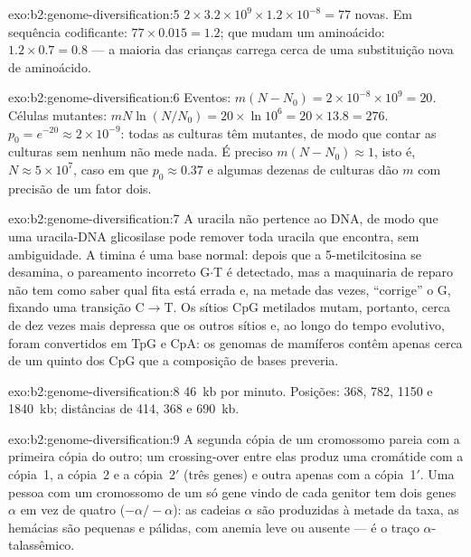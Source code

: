 \begin{solution}{exo:b2:genome-diversification:5}
$2\times 3.2\times 10^{9}\times 1.2\times 10^{-8} = 77$  novas.
Em sequência codificante: $77\times 0.015 = 1.2$; que mudam um
aminoácido: $1.2\times 0.7 = 0.8$ --- a maioria das crianças carrega
cerca de uma substituição nova de aminoácido.
\end{solution}

\begin{solution}{exo:b2:genome-diversification:6}
Eventos: $m(N - N_0) = 2\times 10^{-8}\times 10^{9} = 20$. Células
mutantes: $mN\ln(N/N_0) = 20\times \ln 10^{6} = 20\times 13.8 = 276$.
$p_0 = e^{-20} \approx 2\times 10^{-9}$: todas as culturas têm
mutantes, de modo que contar as culturas sem nenhum não mede nada. É
preciso $m(N -
N_0) \approx 1$, isto é, $N \approx 5\times 10^{7}$, caso em que
$p_0 \approx
0.37$ e algumas dezenas de culturas dão $m$ com precisão de um fator
dois.
\end{solution}

\begin{solution}{exo:b2:genome-diversification:7}
A uracila não pertence ao DNA, de modo que uma uracila-DNA glicosilase
pode remover toda uracila que encontra, sem ambiguidade. A timina é
uma base normal: depois que a 5-metilcitosina se desamina, o
pareamento incorreto G$\cdot$T é detectado, mas a maquinaria de reparo
não tem como saber qual fita está errada e, na metade das vezes,
``corrige'' o G, fixando uma transição C$\to$T. Os sítios CpG
metilados mutam, portanto, cerca de dez vezes mais depressa que os
outros sítios e, ao longo do tempo evolutivo, foram convertidos em TpG
e CpA: os genomas de mamíferos contêm apenas cerca de um quinto dos CpG
que a composição de bases preveria.
\end{solution}

\begin{solution}{exo:b2:genome-diversification:8}
\qty{46}{kb} por minuto. Posições: 368, 782, 1150 e
\qty{1840}{kb}; distâncias de 414, 368 e \qty{690}{kb}.
\end{solution}

\begin{solution}{exo:b2:genome-diversification:9}
A segunda cópia de um cromossomo pareia com a primeira cópia do outro;
um crossing-over entre elas produz uma cromátide com a cópia~1, a
cópia~2 e a cópia~2$'$ (três genes) e outra apenas com a
cópia~1$'$. Uma pessoa com um cromossomo de um só gene vindo de cada
genitor tem dois genes $\alpha$ em vez de quatro ($-\alpha/-\alpha$):
as cadeias $\alpha$ são produzidas à metade da taxa, as hemácias são
pequenas e pálidas, com anemia leve ou ausente --- é o traço
$\alpha$-talassêmico.
\end{solution}

